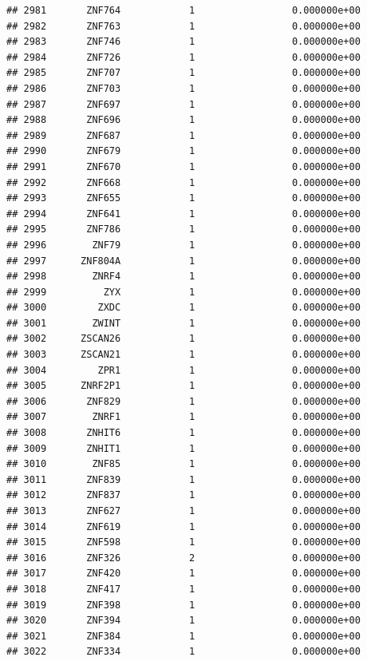 \documentclass[
]{article}
\begin{document}
\begin{verbatim}
## 2981       ZNF764            1                 0.000000e+00
## 2982       ZNF763            1                 0.000000e+00
## 2983       ZNF746            1                 0.000000e+00
## 2984       ZNF726            1                 0.000000e+00
## 2985       ZNF707            1                 0.000000e+00
## 2986       ZNF703            1                 0.000000e+00
## 2987       ZNF697            1                 0.000000e+00
## 2988       ZNF696            1                 0.000000e+00
## 2989       ZNF687            1                 0.000000e+00
## 2990       ZNF679            1                 0.000000e+00
## 2991       ZNF670            1                 0.000000e+00
## 2992       ZNF668            1                 0.000000e+00
## 2993       ZNF655            1                 0.000000e+00
## 2994       ZNF641            1                 0.000000e+00
## 2995       ZNF786            1                 0.000000e+00
## 2996        ZNF79            1                 0.000000e+00
## 2997      ZNF804A            1                 0.000000e+00
## 2998        ZNRF4            1                 0.000000e+00
## 2999          ZYX            1                 0.000000e+00
## 3000         ZXDC            1                 0.000000e+00
## 3001        ZWINT            1                 0.000000e+00
## 3002      ZSCAN26            1                 0.000000e+00
## 3003      ZSCAN21            1                 0.000000e+00
## 3004         ZPR1            1                 0.000000e+00
## 3005      ZNRF2P1            1                 0.000000e+00
## 3006       ZNF829            1                 0.000000e+00
## 3007        ZNRF1            1                 0.000000e+00
## 3008       ZNHIT6            1                 0.000000e+00
## 3009       ZNHIT1            1                 0.000000e+00
## 3010        ZNF85            1                 0.000000e+00
## 3011       ZNF839            1                 0.000000e+00
## 3012       ZNF837            1                 0.000000e+00
## 3013       ZNF627            1                 0.000000e+00
## 3014       ZNF619            1                 0.000000e+00
## 3015       ZNF598            1                 0.000000e+00
## 3016       ZNF326            2                 0.000000e+00
## 3017       ZNF420            1                 0.000000e+00
## 3018       ZNF417            1                 0.000000e+00
## 3019       ZNF398            1                 0.000000e+00
## 3020       ZNF394            1                 0.000000e+00
## 3021       ZNF384            1                 0.000000e+00
## 3022       ZNF334            1                 0.000000e+00

\end{verbatim}
\end{document}
